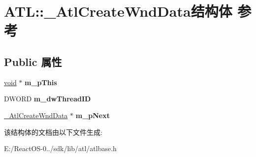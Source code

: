 \hypertarget{struct_a_t_l_1_1___atl_create_wnd_data}{}\section{A\+TL\+:\+:\+\_\+\+Atl\+Create\+Wnd\+Data结构体 参考}
\label{struct_a_t_l_1_1___atl_create_wnd_data}
\subsection*{Public 属性}
\begin{DoxyCompactItemize}
\item 
\mbox{\label{struct_a_t_l_1_1___atl_create_wnd_data_aecd874025da9ec42847921b8222954d1}} 
\hyperlink{interfacevoid}{void} $\ast$ {\bfseries m\+\_\+p\+This}
\item 
\mbox{\label{struct_a_t_l_1_1___atl_create_wnd_data_aeb34f16e10fe066591ac1a9c62645773}} 
D\+W\+O\+RD {\bfseries m\+\_\+dw\+Thread\+ID}
\item 
\mbox{\label{struct_a_t_l_1_1___atl_create_wnd_data_a9c7bddabe77ff25eadb63ae6955fa888}} 
\hyperlink{struct_a_t_l_1_1___atl_create_wnd_data}{\+\_\+\+Atl\+Create\+Wnd\+Data} $\ast$ {\bfseries m\+\_\+p\+Next}
\end{DoxyCompactItemize}


该结构体的文档由以下文件生成\+:\begin{DoxyCompactItemize}
\item 
E\+:/\+React\+O\+S-\/0../sdk/lib/atl/atlbase.\+h\end{DoxyCompactItemize}
